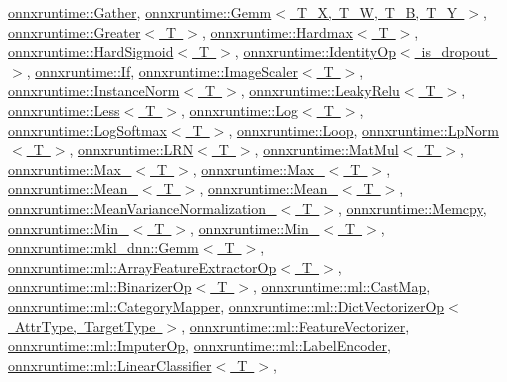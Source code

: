 \mbox{\hyperlink{classonnxruntime_1_1Gather}{onnxruntime\+::\+Gather}}, \mbox{\hyperlink{classonnxruntime_1_1Gemm}{onnxruntime\+::\+Gemm$<$ T\+\_\+\+X, T\+\_\+\+W, T\+\_\+\+B, T\+\_\+\+Y $>$}}, \mbox{\hyperlink{classonnxruntime_1_1Greater}{onnxruntime\+::\+Greater$<$ T $>$}}, \mbox{\hyperlink{classonnxruntime_1_1Hardmax}{onnxruntime\+::\+Hardmax$<$ T $>$}}, \mbox{\hyperlink{classonnxruntime_1_1HardSigmoid}{onnxruntime\+::\+Hard\+Sigmoid$<$ T $>$}}, \mbox{\hyperlink{classonnxruntime_1_1IdentityOp}{onnxruntime\+::\+Identity\+Op$<$ is\+\_\+dropout $>$}}, \mbox{\hyperlink{classonnxruntime_1_1If}{onnxruntime\+::\+If}}, \mbox{\hyperlink{classonnxruntime_1_1ImageScaler}{onnxruntime\+::\+Image\+Scaler$<$ T $>$}}, \mbox{\hyperlink{classonnxruntime_1_1InstanceNorm}{onnxruntime\+::\+Instance\+Norm$<$ T $>$}}, \mbox{\hyperlink{classonnxruntime_1_1LeakyRelu}{onnxruntime\+::\+Leaky\+Relu$<$ T $>$}}, \mbox{\hyperlink{classonnxruntime_1_1Less}{onnxruntime\+::\+Less$<$ T $>$}}, \mbox{\hyperlink{classonnxruntime_1_1Log}{onnxruntime\+::\+Log$<$ T $>$}}, \mbox{\hyperlink{classonnxruntime_1_1LogSoftmax}{onnxruntime\+::\+Log\+Softmax$<$ T $>$}}, \mbox{\hyperlink{classonnxruntime_1_1Loop}{onnxruntime\+::\+Loop}}, \mbox{\hyperlink{classonnxruntime_1_1LpNorm}{onnxruntime\+::\+Lp\+Norm$<$ T $>$}}, \mbox{\hyperlink{classonnxruntime_1_1LRN}{onnxruntime\+::\+L\+R\+N$<$ T $>$}}, \mbox{\hyperlink{classonnxruntime_1_1MatMul}{onnxruntime\+::\+Mat\+Mul$<$ T $>$}}, \mbox{\hyperlink{classonnxruntime_1_1Max__6}{onnxruntime\+::\+Max\+\_$<$ T $>$}}, \mbox{\hyperlink{classonnxruntime_1_1Max__8}{onnxruntime\+::\+Max\+\_$<$ T $>$}}, \mbox{\hyperlink{classonnxruntime_1_1Mean__6}{onnxruntime\+::\+Mean\+\_$<$ T $>$}}, \mbox{\hyperlink{classonnxruntime_1_1Mean__8}{onnxruntime\+::\+Mean\+\_$<$ T $>$}}, \mbox{\hyperlink{classonnxruntime_1_1MeanVarianceNormalization__0}{onnxruntime\+::\+Mean\+Variance\+Normalization\+\_$<$ T $>$}}, \mbox{\hyperlink{classonnxruntime_1_1Memcpy}{onnxruntime\+::\+Memcpy}}, \mbox{\hyperlink{classonnxruntime_1_1Min__6}{onnxruntime\+::\+Min\+\_$<$ T $>$}}, \mbox{\hyperlink{classonnxruntime_1_1Min__8}{onnxruntime\+::\+Min\+\_$<$ T $>$}}, \mbox{\hyperlink{classonnxruntime_1_1mkl__dnn_1_1Gemm}{onnxruntime\+::mkl\+\_\+dnn\+::\+Gemm$<$ T $>$}}, \mbox{\hyperlink{classonnxruntime_1_1ml_1_1ArrayFeatureExtractorOp}{onnxruntime\+::ml\+::\+Array\+Feature\+Extractor\+Op$<$ T $>$}}, \mbox{\hyperlink{classonnxruntime_1_1ml_1_1BinarizerOp}{onnxruntime\+::ml\+::\+Binarizer\+Op$<$ T $>$}}, \mbox{\hyperlink{classonnxruntime_1_1ml_1_1CastMap}{onnxruntime\+::ml\+::\+Cast\+Map}}, \mbox{\hyperlink{classonnxruntime_1_1ml_1_1CategoryMapper}{onnxruntime\+::ml\+::\+Category\+Mapper}}, \mbox{\hyperlink{classonnxruntime_1_1ml_1_1DictVectorizerOp}{onnxruntime\+::ml\+::\+Dict\+Vectorizer\+Op$<$ Attr\+Type, Target\+Type $>$}}, \mbox{\hyperlink{classonnxruntime_1_1ml_1_1FeatureVectorizer}{onnxruntime\+::ml\+::\+Feature\+Vectorizer}}, \mbox{\hyperlink{classonnxruntime_1_1ml_1_1ImputerOp}{onnxruntime\+::ml\+::\+Imputer\+Op}}, \mbox{\hyperlink{classonnxruntime_1_1ml_1_1LabelEncoder}{onnxruntime\+::ml\+::\+Label\+Encoder}}, \mbox{\hyperlink{classonnxruntime_1_1ml_1_1LinearClassifier}{onnxruntime\+::ml\+::\+Linear\+Classifier$<$ T $>$}}, 